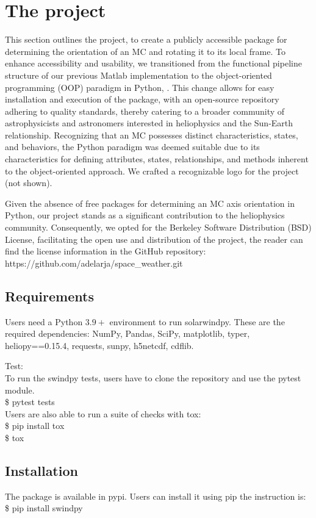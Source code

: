 \documentclass[baaa]{baaa}
\begin{document}
\section{The project}
This section outlines the project, to create a publicly accessible package for determining the orientation of an MC and rotating it to its local frame. To enhance accessibility and usability, we transitioned from the functional pipeline structure of our previous Matlab implementation to the object-oriented programming (OOP) paradigm in Python, \citep{roth2022n}. This change allows for easy installation and execution of the package, with an open-source repository adhering to quality standards, thereby catering to a broader community of astrophysicists and astronomers interested in heliophysics and the Sun-Earth relationship.
Recognizing that an MC possesses distinct characteristics, states, and behaviors, the Python paradigm was deemed suitable due to its characteristics for defining attributes, states, relationships, and methods inherent to the object-oriented approach. We crafted a recognizable logo for the project (not shown).

Given the absence of free packages for determining an MC axis orientation in Python, our project stands as a significant contribution to the heliophysics community. Consequently, we opted for the Berkeley Software Distribution (BSD) License, facilitating the open use and distribution of the project, the reader can find the license information in the GitHub repository:
\ \\ https://github.com/adelarja/space\_weather.git\
\subsection{Requirements}
Users need a Python $3.9+$ environment to run solarwindpy.
These are the required dependencies:
NumPy, Pandas, SciPy, matplotlib, typer, heliopy==0.15.4, requests, sunpy, h5netcdf, cdflib.

Test:\\
To run the swindpy tests, users have to clone the repository and use the pytest module.\\
\$ pytest tests\\
Users are also able to run a suite of checks with tox:\\
 \$ pip install tox \\
 \$ tox
\subsection{Installation}
The package is available in pypi. Users can install it using pip
the instruction is:
    \$ pip install swindpy  
\end{document}
